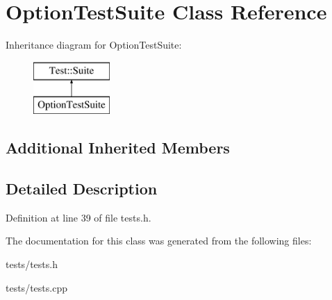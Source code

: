 \hypertarget{class_option_test_suite}{}\section{Option\+Test\+Suite Class Reference}
\label{class_option_test_suite}
Inheritance diagram for Option\+Test\+Suite\+:\begin{figure}[H]
\begin{center}
\leavevmode
\includegraphics[height=2.000000cm]{class_option_test_suite}
\end{center}
\end{figure}
\subsection*{Additional Inherited Members}


\subsection{Detailed Description}


Definition at line 39 of file tests.\+h.



The documentation for this class was generated from the following files\+:\begin{DoxyCompactItemize}
\item 
tests/tests.\+h\item 
tests/tests.\+cpp\end{DoxyCompactItemize}
